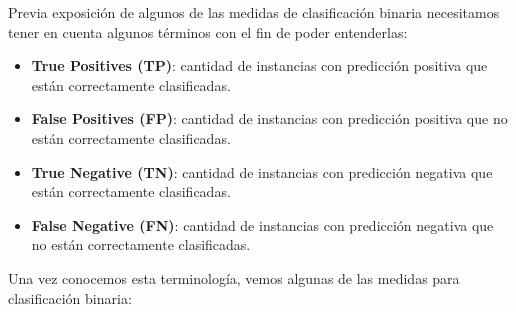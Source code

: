 Previa exposición de algunos de las medidas de clasificación binaria necesitamos tener en cuenta algunos términos con el fin de poder entenderlas:
\begin{itemize}
	\item \textbf{True Positives (TP)}: cantidad de instancias con predicción positiva que están correctamente clasificadas.
	\item \textbf{False Positives (FP)}: cantidad de instancias con predicción positiva que no están correctamente clasificadas.
	\item \textbf{True Negative (TN)}: cantidad de instancias con predicción negativa que están correctamente clasificadas.
	\item \textbf{False Negative (FN)}: cantidad de instancias con predicción negativa que no están correctamente clasificadas.
\end{itemize}

Una vez conocemos esta terminología, vemos algunas de las medidas para clasificación binaria:

